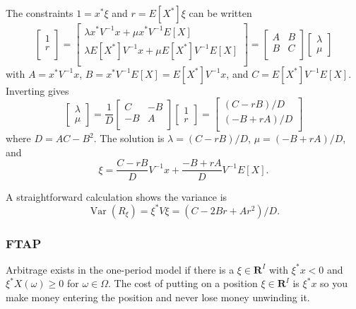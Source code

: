 The constraints \(1 = x^*\xi\) and \(r = E[X^*]\xi\) can be written \[
\begin{bmatrix}
1 \\
r \\
\end{bmatrix}
=
\begin{bmatrix}
\lambda x^*V^{-1}x + \mu x^*V^{-1}E[X] \\
\lambda E[X^*]V^{-1}x + \mu E[X^*]V^{-1}E[X] \\
\end{bmatrix}
= \begin{bmatrix}
A & B \\
B & C\\
\end{bmatrix}
\begin{bmatrix}
\lambda \\
\mu
\end{bmatrix}
\] with \(A = x^* V^{-1}x\), \(B = x^* V^{-1}E[X] = E[X^*]V^{-1}x\), and
\(C = E[X^*] V^{-1}E[X]\). Inverting gives \[
\begin{bmatrix} \lambda \\ \mu \end{bmatrix}
= \frac{1}{D}
\begin{bmatrix}
C & -B \\
-B & A\\
\end{bmatrix}
\begin{bmatrix}
1 \\
r
\end{bmatrix}
=
\begin{bmatrix}
(C - r B)/D \\
(-B + r A)/D\\
\end{bmatrix}
\] where \(D = AC - B^2\). The solution is \(\lambda = (C - r B)/D\),
\(\mu = (-B + r A)/D\), and \[
    \xi = \frac{C - r B}{D} V^{-1}x + \frac{-B + r A}{D} V^{-1}E[X].
\]

A straightforward calculation shows the variance is \[
\operatorname{Var}(R_\xi) = \xi^* V\xi = (C - 2Br + Ar^2)/D.
\]

\subsubsection{FTAP}\label{ftap}

Arbitrage exists in the one-period model if there is a
\(\xi\in\mathbf{R}^I\) with \(\xi^* x < 0\) and \(\xi^* X(\omega)\ge0\)
for \(\omega\in\Omega\). The cost of putting on a position
\(\xi\in\mathbf{R}^I\) is \(\xi^*x\) so you make money entering the
position and never lose money unwinding it.

